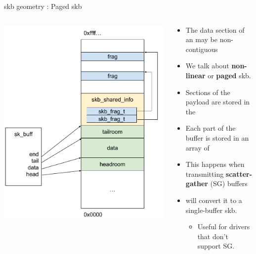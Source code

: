\begin{frame}{skb geometry : Paged skb}
	\begin{columns}
		\begin{column}{0.25\textwidth}
			\includegraphics[width=1.3\textwidth]{slides/networking-skb/skb_nonlinear.pdf}
		\end{column}
		\begin{column}{0.75\textwidth}
			\begin{itemize}
				\item The data section of an  may be non-contiguous
				\item We talk about \textbf{non-linear} or \textbf{paged} skb.
				\item Sections of the payload are stored in the 
				\item Each part of the buffer is stored in an array of 
				\item This happens when transmitting \textbf{scatter-gather} (SG) buffers
				\item {} will convert it to a single-buffer skb.
					\begin{itemize}
						\item Useful for drivers that don't support SG.
					\end{itemize}
			\end{itemize}
		\end{column}
	\end{columns}
\end{frame}

